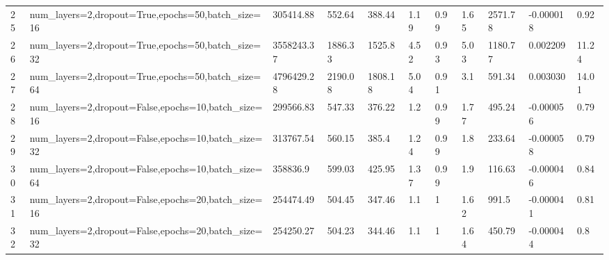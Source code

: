 \begin{longtable}{C{0.8cm} L{2cm} C{1.15cm} C{1.15cm} C{1.15cm} C{1.15cm} C{0.85cm} C{1.25cm} C{1.2cm} C{1.5cm} C{1.0cm}}
25 & num\_layers=2,\newline dropout=True,\newline epochs=50,\newline batch\_size=16 & 305414.88 & 552.64 & 388.44 & 1.19 & 0.99 & 1.65 & 2571.78 & -0.000018 & 0.92 \\
26 & num\_layers=2,\newline dropout=True,\newline epochs=50,\newline batch\_size=32 & 3558243.37 & 1886.33 & 1525.8 & 4.52 & 0.93 & 5.03 & 1180.77 & 0.002209 & 11.24 \\
27 & num\_layers=2,\newline dropout=True,\newline epochs=50,\newline batch\_size=64 & 4796429.28 & 2190.08 & 1808.18 & 5.04 & 0.91 & 3.1 & 591.34 & 0.003030 & 14.01 \\
28 & num\_layers=2,\newline dropout=False,\newline epochs=10,\newline batch\_size=16 & 299566.83 & 547.33 & 376.22 & 1.2 & 0.99 & 1.77 & 495.24 & -0.000056 & 0.79 \\
29 & num\_layers=2,\newline dropout=False,\newline epochs=10,\newline batch\_size=32 & 313767.54 & 560.15 & 385.4 & 1.24 & 0.99 & 1.8 & 233.64 & -0.000058 & 0.79 \\
30 & num\_layers=2,\newline dropout=False,\newline epochs=10,\newline batch\_size=64 & 358836.9 & 599.03 & 425.95 & 1.37 & 0.99 & 1.9 & 116.63 & -0.000046 & 0.84 \\
31 & num\_layers=2,\newline dropout=False,\newline epochs=20,\newline batch\_size=16 & 254474.49 & 504.45 & 347.46 & 1.1 & 1 & 1.62 & 991.5 & -0.000041 & 0.81 \\
32 & num\_layers=2,\newline dropout=False,\newline epochs=20,\newline batch\_size=32 & 254250.27 & 504.23 & 344.46 & 1.1 & 1 & 1.64 & 450.79 & -0.000044 & 0.8 \\

\end{longtable}
